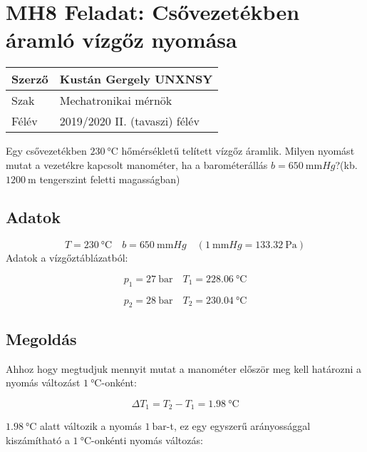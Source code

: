 \section*{MH8 Feladat: Csővezetékben áramló vízgőz nyomása}
\begin{tabular}{ | p{2cm} | p{14cm} | } 
	\hline
	Szerző & Kustán Gergely UNXNSY \\ 
	\hline
	Szak & Mechatronikai mérnök  \\ 
	\hline
	Félév & 2019/2020 II. (tavaszi) félév \\ 
	\hline
\end{tabular}
\vspace{0.5cm}

\noindent
Egy csővezetékben $\SI{230}{\celsius}$ hőmérsékletű telített vízgőz áramlik. Milyen nyomást mutat a vezetékre kapcsolt manométer, ha a barométerállás $b=\SI{650}{\milli\meter} Hg$?(kb. $\SI{1200}{\meter}$ tengerszint feletti magasságban)

\subsection*{Adatok}
\begin{equation*}
	T=\SI{230}{\celsius}
	\quad
	b=\SI{650}{\milli\meter} Hg
	\quad
	(\SI{1}{\milli\meter}Hg=\SI{133,32}{\pascal})
\end{equation*}
\noindent
Adatok a vízgőztáblázatból:

\begin{equation*}
	p_1=\SI{27}{\bar}
	\quad
	T_1=\SI{228,06}{\celsius}
\end{equation*}

\begin{equation*}
	p_2=\SI{28}{\bar}
	\quad
	T_2=\SI{230,04}{\celsius}
\end{equation*}
\subsection*{Megoldás}
Ahhoz hogy megtudjuk mennyit mutat a manométer először meg kell határozni a nyomás változást $\SI{1}{\celsius}$-onként:

\begin{equation}
	\Delta{T_1}=T_2-T_1=\SI{1,98}{\celsius}
\end{equation}

\noindent
$\SI{1,98}{\celsius}$ alatt változik a nyomás $\SI{1}{\bar}$-t, ez egy egyszerű arányossággal kiszámítható a $\SI{1}{\celsius}$-onkénti nyomás változás:

